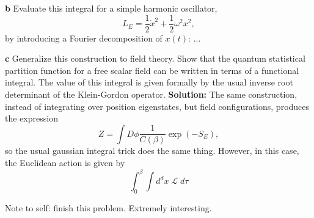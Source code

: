 \documentclass{book}
\begin{document}
\textbf{b} Evaluate this integral for a simple harmonic oscillator, 
\[
L_E = \frac{1}{2} \dot{x}^2 + \frac{1}{2} \omega^2 x^2 ,
\]
by introducing a Fourier decomposition of $x(t)$:
... 

\textbf{c} Generalize this construction to field theory. Show that the quantum statistical partition function for a free scalar field can be written in terms of a functional integral. The value of this integral is given formally by the usual inverse root determinant of the Klein-Gordon operator. \newline
\textbf{Solution:} \newline
The same construction, instead of integrating over position eigenstates, but field configurations, produces the expression
\[
Z = \int D\phi \frac{1}{C(\beta)} \exp(-S_E),
\]
so the usual gaussian integral trick does the same thing. However, in this case, the Euclidean action is given by 
\[
\int_0^\beta \int d^d x \; \mathcal{L} \; d\tau
\]

Note to self: finish this problem. Extremely interesting.
\end{document}
